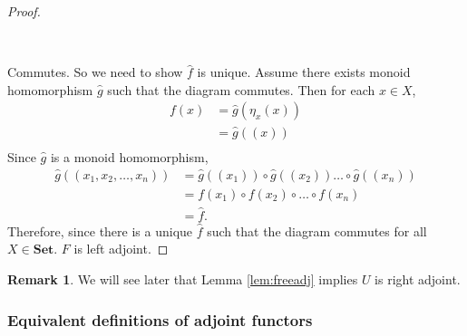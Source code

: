 \documentclass[11pt,a4paper]{article}
\theoremstyle{definition}
\newtheorem{remark}[thm]{Remark}
\numberwithin{equation}{section}
\begin{document}
\begin{proof}
\begin{center}
\\
\end{center}
Commutes. So we need to show $\hat{f}$ is unique. Assume there exists monoid homomorphism $\hat{g}$ such that the diagram commutes. Then for each $x\in X$,
\begin{align*}
    f(x) &= \hat{g}(\eta_{x}(x))\\
    &= \hat{g}((x))\\
\end{align*}
Since $\hat{g}$ is a monoid homomorphism,
\begin{align*}
    \hat{g}((x_{1},x_{2},\dots,x_{n}))&=\hat{g}((x_{1}))\circ\hat{g}((x_{2}))\dots\circ\hat{g}((x_{n}))\\
    &= f(x_{1})\circ f(x_{2})\circ\dots\circ f(x_{n})\\
    &= \hat{f}.
\end{align*}
Therefore, since there is a unique $\hat{f}$ such that the diagram commutes for all $X\in\mathbf{Set}$. $F$ is left adjoint.
\end{proof}
\begin{remark}
    We will see later that Lemma \ref{lem:freeadj} implies $U$ is right adjoint.
\end{remark}
\subsubsection{Equivalent definitions of adjoint functors}
\label{ss:equdefadjfunctors} 
\end{document}
